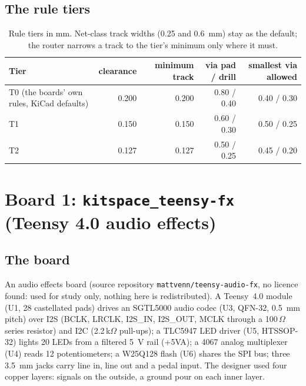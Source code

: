 \documentclass[10pt,a4paper]{article}
\begin{document}
\subsection{The rule tiers}\label{sec:tiers}

\begin{table}[H]\centering\small
\begin{tabular}{lrrrr}
\toprule
Tier & clearance & minimum track & via pad / drill & smallest via allowed\\
\midrule
T0 (the boards' own rules, KiCad defaults) & 0.200 & 0.200 & 0.80 / 0.40 & 0.40 / 0.30\\
T1 & 0.150 & 0.150 & 0.60 / 0.30 & 0.50 / 0.25\\
T2 & 0.127 & 0.127 & 0.50 / 0.25 & 0.45 / 0.20\\
\bottomrule
\end{tabular}
\caption{Rule tiers in mm. Net-class track widths (0.25 and 0.6~mm) stay as the default; the router narrows a track to the tier's minimum only where it must.}
\end{table}

\section{Board 1: \texttt{kitspace\_teensy-fx} (Teensy 4.0 audio effects)}

\subsection{The board}

An audio effects board (source repository \texttt{mattvenn/teensy-audio-fx}, no licence found: used for study only, nothing here is redistributed). A Teensy~4.0 module (U1, 28 castellated pads)
drives an SGTL5000 audio codec (U3, QFN-32, 0.5~mm pitch) over I2S (BCLK, LRCLK, I2S\_IN, I2S\_OUT, MCLK through a 100\,$\Omega$ series resistor) and I2C (2.2\,k$\Omega$ pull-ups); a TLC5947 LED driver (U5, HTSSOP-32) lights
20 LEDs from a filtered 5~V rail (+5VA); a 4067 analog multiplexer (U4) reads 12 potentiometers; a W25Q128 flash (U6) shares the SPI bus; three 3.5~mm jacks carry line in, line out and a pedal input.
The designer used four copper layers: signals on the outside, a ground pour on each inner layer.

\begin{table}[H]\centering\small\caption{The board.}\end{table}
\end{document}

